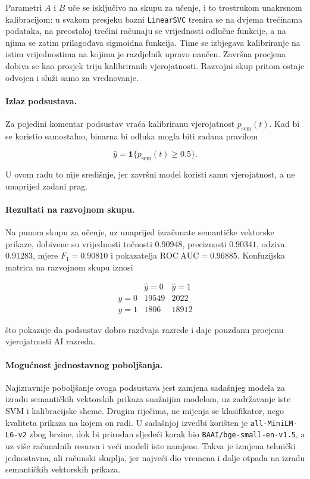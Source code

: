 \documentclass{article}
\begin{document}
Parametri $A$ i $B$ uče se isključivo na skupu za učenje, i to trostrukom unakrsnom kalibracijom: u svakom presjeku bazni \texttt{LinearSVC} trenira se na dvjema trećinama podataka, na preostaloj trećini računaju se vrijednosti odlučne funkcije, a na njima se zatim prilagođava sigmoidna funkcija. Time se izbjegava kalibriranje na istim vrijednostima na kojima je razdjelnik upravo naučen. Završna procjena dobiva se kao prosjek triju kalibriranih vjerojatnosti. Razvojni skup pritom ostaje odvojen i služi samo za vrednovanje.

\paragraph{Izlaz podsustava.}
Za pojedini komentar podsustav vraća kalibriranu vjerojatnost $p_{\mathrm{sem}}(t)$. Kad bi se koristio samostalno, binarna bi odluka mogla biti zadana pravilom

\[
\hat y = \mathbf{1}\{p_{\mathrm{sem}}(t)\ge 0.5\}.
\]

U ovom radu to nije središnje, jer završni model koristi samu vjerojatnost, a ne unaprijed zadani prag.

\paragraph{Rezultati na razvojnom skupu.}
Na punom skupu za učenje, uz unaprijed izračunate semantičke vektorske prikaze, dobivene su vrijednosti točnosti $0.90948$, preciznosti $0.90341$, odziva $0.91283$, mjere $F_1=0.90810$ i pokazatelja $\mathrm{ROC\ AUC}=0.96885$. Konfuzijska matrica na razvojnom skupu iznosi

\[
\begin{array}{c|cc}
 & \hat y=0 & \hat y=1 \\
\hline
y=0 & 19549 & 2022 \\
y=1 & 1806 & 18912
\end{array}
\]

što pokazuje da podsustav dobro razdvaja razrede i daje pouzdanu procjenu vjerojatnosti AI razreda.

\paragraph{Mogućnost jednostavnog poboljšanja.}
Najizravnije poboljšanje ovoga podsustava jest zamjena sadašnjeg modela za izradu semantičkih vektorskih prikaza snažnijim modelom, uz zadržavanje iste SVM i kalibracijske sheme. Drugim riječima, ne mijenja se klasifikator, nego kvaliteta prikaza na kojem on radi. U sadašnjoj izvedbi korišten je \texttt{all-MiniLM-L6-v2} zbog brzine, dok bi prirodan sljedeći korak bio \texttt{BAAI/bge-small-en-v1.5}, a uz više računalnih resursa i veći modeli iste namjene. Takva je izmjena tehnički jednostavna, ali računski skuplja, jer najveći dio vremena i dalje otpada na izradu semantičkih vektorskih prikaza.
\end{document}
